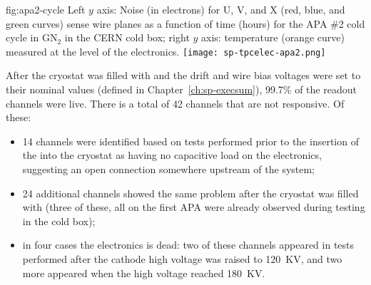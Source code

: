 \begin{dunefigure}
{fig:apa2-cycle}
{Left $y$ axis: Noise (in electrons) for U, V, and X (red, blue, and green 
curves) sense wire planes as a function of time (hours) for the APA \#2 cold 
cycle in GN$_2$ in the CERN cold box; right $y$ axis: temperature 
(orange curve) measured at the level of the  electronics.}
\texttt{[image: sp-tpcelec-apa2.png]}
\end{dunefigure}
After the cryostat was filled with  and the drift and wire 
bias voltages were set to their nominal values (defined in Chapter~\ref{ch:sp-execsum}), 
99.7\% of the  readout channels were live.
There is a total of 42 channels that are not responsive. Of these:
\begin{itemize}
\item{14 channels were identified based on tests performed prior
to the insertion of the  into the cryostat as having
no capacitive load on the  electronics, suggesting an open 
connection somewhere upstream  of the  system;}
\item{24 additional channels showed the same problem after the
cryostat was filled with  (three of these, all on the
first APA were already observed during testing in the cold box);}
\item{in four cases the  electronics is dead: two of these
channels appeared in tests performed after the cathode high
voltage was raised to \SI{120}{KV}, and two more
appeared when the high voltage reached \SI{180}{KV}.}
\end{itemize}

